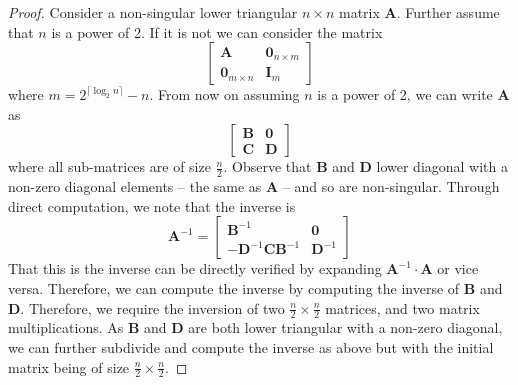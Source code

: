 \documentclass[10pt,a4paper]{article}
\newtheorem{theorem}{Theorem}[section]
\newcommand{\matsize}[2]{#1\times #2}
\newcommand{\mat}[1]{\mathbf{#1}}
\begin{document}
 \thmmatrixinv*
 \begin{proof}
  Consider a non-singular lower triangular  $\matsize{n}{n}$ matrix $\mat{A}$.  Further assume that $n$ is a power of 2. If it is not we can consider the matrix 
 \[\begin{bmatrix}\mat{A} & \mat{0}_{\matsize{n}{m}}\\ \mat{0}_{\matsize{m}{n}} & \mat{I}_{m}\end{bmatrix}\]
 where $m=2^{\lceil \log_2 n\rceil} - n$. 
From now on assuming $n$ is a power of 2, we can write $\mat{A}$ as
 \[
     \begin{bmatrix}
         \mat{B}&\mat{0} \\
         \mat{C} &\mat{D}
     \end{bmatrix}\]
 where all sub-matrices are of size $\frac{n}{2}$.
 Observe that $\mat{B}$ and $\mat{D}$ lower diagonal with a non-zero diagonal elements  -- the same as $\mat{A}$ -- and so are non-singular. Through direct computation, we note that the inverse is 
 \[\mat{A}^{-1} = 
     \begin{bmatrix}
         \mat{B}^{-1}&\mat{0} \\
         -\mat{D}^{-1}\mat{C}\mat{B}^{-1} &\mat{D}^{-1}  
     \end{bmatrix}\]
 That this is the inverse can be directly verified by expanding $\mat{A}^{-1} \cdot \mat{A}$ or vice versa. Therefore, we can compute the inverse by computing the inverse of $\mat{B}$ and $\mat{D}$.
 Therefore, we require the inversion of two $\matsize{\frac{n}{2}}{\frac{n}{2}}$ matrices, and two matrix multiplications. 
%
 As $\mat{B}$ and $\mat{D}$ are both lower triangular with a non-zero diagonal, we can further subdivide and compute the inverse as above but with the initial matrix being of size $\matsize{\frac{n}{2}}{\frac{n}{2}}$.




\end{proof}
\end{document}

